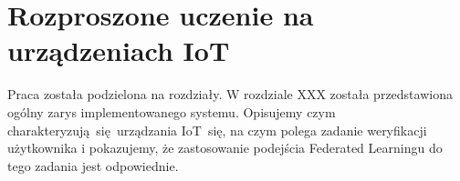 \newpage
\section[general]{Rozproszone uczenie na urządzeniach IoT}


Praca została podzielona na rozdziały. W rozdziale XXX została przedstawiona ogólny zarys implementowanego systemu. Opisujemy czym charakteryzują się urządzania IoT się, na czym polega zadanie weryfikacji użytkownika i pokazujemy, że zastosowanie podejścia Federated Learningu do tego zadania jest odpowiednie.
